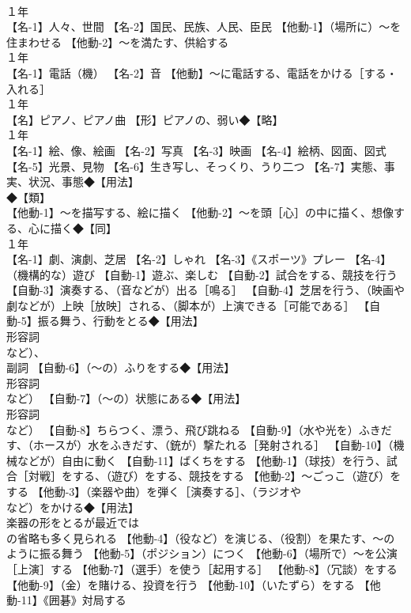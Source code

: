 \documentclass[8pt]{extreport}
\begin{document}
\begin{CJK}{UTF8}{min}
\\	１年	
\\	【名-1】人々、世間 【名-2】国民、民族、人民、臣民 【他動-1】（場所に）～を住まわせる 【他動-2】～を満たす、供給する
\\	１年	
\\	【名-1】電話（機） 【名-2】音 【他動】～に電話する、電話をかける［する・入れる］
\\	１年	
\\	【名】ピアノ、ピアノ曲 【形】ピアノの、弱い◆【略】
\\	１年	
\\	【名-1】絵、像、絵画 【名-2】写真 【名-3】映画 【名-4】絵柄、図面、図式 【名-5】光景、見物 【名-6】生き写し、そっくり、うり二つ 【名-7】実態、事実、状況、事態◆【用法】
\\	◆【類】
\\	【他動-1】～を描写する、絵に描く 【他動-2】～を頭［心］の中に描く、想像する、心に描く◆【同】
\\	１年	
\\	【名-1】劇、演劇、芝居 【名-2】しゃれ 【名-3】《スポーツ》プレー 【名-4】（機構的な）遊び 【自動-1】遊ぶ、楽しむ 【自動-2】試合をする、競技を行う 【自動-3】演奏する、（音などが）出る［鳴る］ 【自動-4】芝居を行う、（映画や劇などが）上映［放映］される、（脚本が）上演できる［可能である］ 【自動-5】振る舞う、行動をとる◆【用法】
\\	形容詞
\\	など）、
\\	副詞 【自動-6】（～の）ふりをする◆【用法】
\\	形容詞
\\	など） 【自動-7】（～の）状態にある◆【用法】
\\	形容詞
\\	など） 【自動-8】ちらつく、漂う、飛び跳ねる 【自動-9】（水や光を）ふきだす、（ホースが）水をふきだす、（銃が）撃たれる［発射される］ 【自動-10】（機械などが）自由に動く 【自動-11】ばくちをする 【他動-1】（球技）を行う、試合［対戦］をする、（遊び）をする、競技をする 【他動-2】～ごっこ（遊び）をする 【他動-3】（楽器や曲）を弾く［演奏する］、（ラジオや 
\\	など）をかける◆【用法】
\\	楽器の形をとるが最近では 
\\	の省略も多く見られる 【他動-4】（役など）を演じる、（役割）を果たす、～のように振る舞う 【他動-5】（ポジション）につく 【他動-6】（場所で）～を公演［上演］する 【他動-7】（選手）を使う［起用する］ 【他動-8】（冗談）をする 【他動-9】（金）を賭ける、投資を行う 【他動-10】（いたずら）をする 【他動-11】《囲碁》対局する

\end{CJK}
\end{document}
